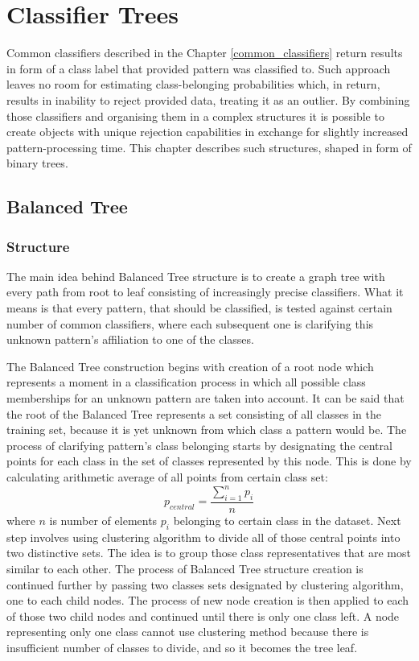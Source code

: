 \chapter{Classifier Trees}

Common classifiers described in the Chapter \ref{common_classifiers} return results in form of a class label that provided pattern was classified to. Such approach leaves no room for estimating class-belonging probabilities which, in return, results in inability to reject provided data, treating it as an outlier. By combining those classifiers and organising them in a complex structures it is possible to create objects with unique rejection capabilities in exchange for slightly increased pattern-processing time. This chapter describes such structures, shaped in form of binary trees.

\section{Balanced Tree}

\subsection{Structure}

The main idea behind Balanced Tree structure is to create a graph tree with every path from root to leaf consisting of increasingly precise classifiers. What it means is that every pattern, that should be classified, is tested against certain number of common classifiers, where each subsequent one is clarifying this unknown pattern's affiliation to one of the classes.

The Balanced Tree construction begins with creation of a root node which represents a moment in a classification process in which all possible class memberships for an unknown pattern are taken into account. It can be said that the root of the Balanced Tree represents a set consisting of all classes in the training set, because it is yet unknown from which class a pattern would be. The process of clarifying pattern's class belonging starts by designating the central points for each class in the set of classes represented by this node. This is done by calculating arithmetic average of all points from certain class set: \[ p_{central} = \frac{\sum\limits_{i=1}^n p_{i}}{n} \] where $n$ is number of elements $p_{i}$ belonging to certain class in the dataset. Next step involves using clustering algorithm to divide all of those central points into two distinctive sets. The idea is to group those class representatives that are most similar to each other. The process of Balanced Tree structure creation is continued further by passing two classes sets designated by clustering algorithm, one to each child nodes. The process of new node creation is then applied to each of those two child nodes and continued until there is only one class left. A node representing only one class cannot use clustering method because there is insufficient number of classes to divide, and so it becomes the tree leaf. 

